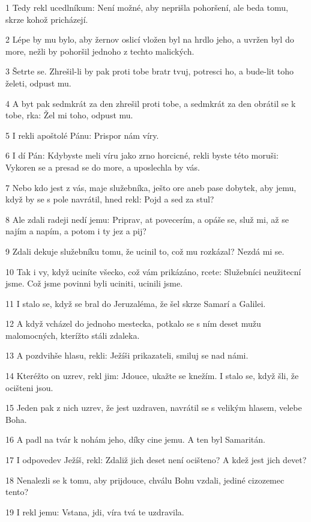 \par 1 Tedy rekl ucedlníkum: Není možné, aby neprišla pohoršení, ale beda tomu, skrze kohož pricházejí.
\par 2 Lépe by mu bylo, aby žernov oslicí vložen byl na hrdlo jeho, a uvržen byl do more, nežli by pohoršil jednoho z techto malických.
\par 3 Šetrte se. Zhrešil-li by pak proti tobe bratr tvuj, potresci ho, a bude-lit toho želeti, odpust mu.
\par 4 A byt pak sedmkrát za den zhrešil proti tobe, a sedmkrát za den obrátil se k tobe, rka: Žel mi toho, odpust mu.
\par 5 I rekli apoštolé Pánu: Prispor nám víry.
\par 6 I dí Pán: Kdybyste meli víru jako zrno horcicné, rekli byste této moruši: Vykoren se a presad se do more, a uposlechla by vás.
\par 7 Nebo kdo jest z vás, maje služebníka, ješto ore aneb pase dobytek, aby jemu, když by se s pole navrátil, hned rekl: Pojd a sed za stul?
\par 8 Ale zdali radeji nedí jemu: Priprav, at povecerím, a opáše se, služ mi, až se najím a napím, a potom i ty jez a pij?
\par 9 Zdali dekuje služebníku tomu, že ucinil to, což mu rozkázal? Nezdá mi se.
\par 10 Tak i vy, když uciníte všecko, což vám prikázáno, rcete: Služebníci neužitecní jsme. Což jsme povinni byli uciniti, ucinili jsme.
\par 11 I stalo se, když se bral do Jeruzaléma, že šel skrze Samarí a Galilei.
\par 12 A když vcházel do jednoho mestecka, potkalo se s ním deset mužu malomocných, kterížto stáli zdaleka.
\par 13 A pozdvihše hlasu, rekli: Ježíši prikazateli, smiluj se nad námi.
\par 14 Kteréžto on uzrev, rekl jim: Jdouce, ukažte se knežím. I stalo se, když šli, že ocišteni jsou.
\par 15 Jeden pak z nich uzrev, že jest uzdraven, navrátil se s velikým hlasem, velebe Boha.
\par 16 A padl na tvár k nohám jeho, díky cine jemu. A ten byl Samaritán.
\par 17 I odpovedev Ježíš, rekl: Zdaliž jich deset není ocišteno? A kdež jest jich devet?
\par 18 Nenalezli se k tomu, aby prijdouce, chválu Bohu vzdali, jediné cizozemec tento?
\par 19 I rekl jemu: Vstana, jdi, víra tvá te uzdravila.
